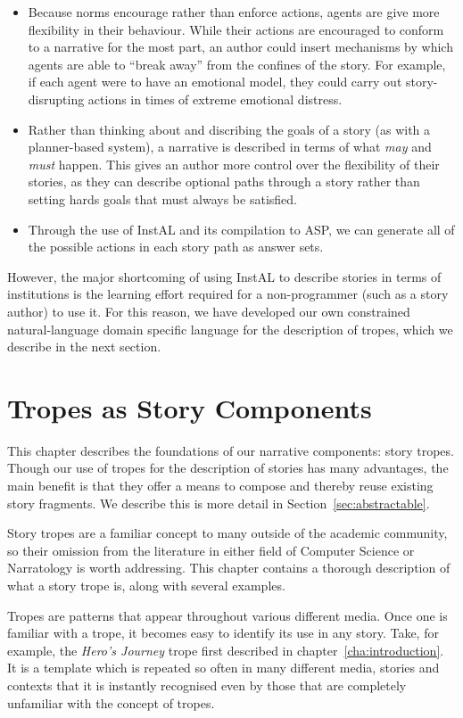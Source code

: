 \documentclass[11pt]{report}
\begin{document}
\begin{itemize}
  \item Because norms encourage rather than enforce actions, agents are give
    more flexibility in their behaviour. While their actions are encouraged to
    conform to a narrative for the most part, an author could insert mechanisms
    by which agents are able to ``break away'' from the confines of the story.
    For example, if each agent were to have an emotional model, they could carry
    out story-disrupting actions in times of extreme emotional distress.
  \item Rather than thinking about and discribing the goals of a story (as with
    a planner-based system), a narrative is described in terms of what
    \emph{may} and \emph{must} happen. This gives an author more control over
    the flexibility of their stories, as they can describe optional paths
    through a story rather than setting hards goals that must always be
    satisfied.
  \item Through the use of InstAL and its compilation to ASP, we can generate
    all of the possible actions in each story path as answer sets.
\end{itemize}

However, the major shortcoming of using InstAL to describe stories in terms of
institutions is the learning effort required for a non-programmer (such as a
story author) to use it. For this reason, we have developed our own constrained
natural-language domain specific language for the description of tropes, which
we describe in the next section.

\chapter{Tropes as Story Components}
\label{cha:tropes}
This chapter describes the foundations of our narrative components: story
tropes. Though our use of tropes for the description of stories has many
advantages, the main benefit is that they offer a means to compose and thereby
reuse existing story fragments. We describe this is more detail in Section~\ref{sec:abstractable}.

Story tropes are a familiar concept to many outside of the academic
community, so their omission from the literature in either field of Computer
Science or Narratology is worth addressing. This chapter contains a thorough
description of what a story trope is, along with several examples.

Tropes are patterns that appear throughout various different media. Once one is familiar
with a trope, it becomes easy to identify its use in any story. Take, for
example, the \emph{Hero's Journey} trope first described in
chapter~\ref{cha:introduction}. It is a template which is repeated so often in
many different media, stories and contexts that it is instantly recognised even
by those that are completely unfamiliar with the concept of tropes.
\end{document}

